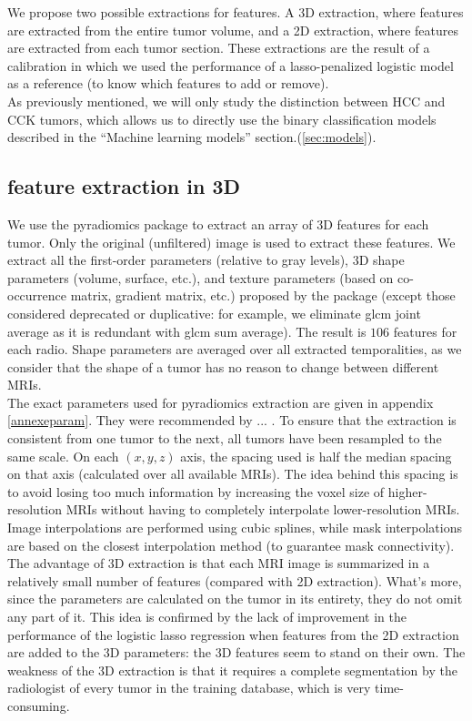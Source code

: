 \documentclass[preprint,12pt]{elsarticle}
\begin{document}
We propose two possible extractions for features. A 3D extraction, where features are extracted from the entire tumor volume, and a 2D extraction, where features are extracted from each tumor section. These extractions are the result of a calibration in which we used the performance of a lasso-penalized logistic model as a reference (to know which features to add or remove).\\
\indent As previously mentioned, we will only study the distinction between HCC and CCK tumors, which allows us to directly use the binary classification models described in the “Machine learning models” section.(\ref{sec:models}). 

\subsection{feature extraction in 3D}
\label{sec:3D}

\noindent We use the pyradiomics package \cite{pyradio} to extract an array of 3D features for each tumor. Only the original (unfiltered) image is used to extract these features. We extract all the first-order parameters (relative to gray levels), 3D shape parameters (volume, surface, etc.), and texture parameters (based on co-occurrence matrix, gradient matrix, etc.) proposed by the package (except those considered deprecated or duplicative: for example, we eliminate glcm joint average as it is redundant with glcm sum average). The result is $106$ features for each radio. Shape parameters are averaged over all extracted temporalities, as we consider that the shape of a tumor has no reason to change between different MRIs.\\
\indent The exact parameters used for pyradiomics extraction are given in appendix \ref{annexeparam}. They were recommended by ... . To ensure that the extraction is consistent from one tumor to the next, all tumors have been resampled to the same scale. On each $(x,y,z)$ axis, the spacing used is half the median spacing on that axis (calculated over all available MRIs). The idea behind this spacing is to avoid losing too much information by increasing the voxel size of higher-resolution MRIs without having to completely interpolate lower-resolution MRIs. Image interpolations are performed using cubic splines, while mask interpolations are based on the closest interpolation method (to guarantee mask connectivity).\\
\indent The advantage of 3D extraction is that each MRI image is summarized in a relatively small number of features (compared with 2D extraction). What's more, since the parameters are calculated on the tumor in its entirety, they do not omit any part of it. This idea is confirmed by the lack of improvement in the performance of the logistic lasso regression when features from the 2D extraction are added to the 3D parameters: the 3D features seem to stand on their own. The weakness of the 3D extraction is that it requires a complete segmentation by the radiologist of every tumor in the training database, which is very time-consuming.
\end{document}
